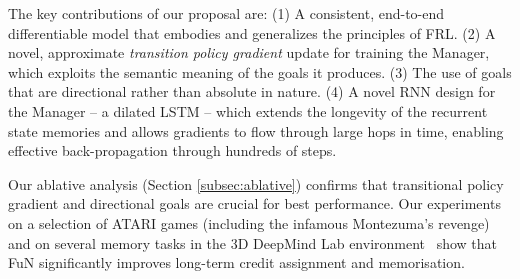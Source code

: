 %
The key contributions of our proposal are: (1) A consistent, end-to-end differentiable model that embodies and generalizes the principles of FRL. (2) A novel, approximate \textit{transition policy gradient} update for training the Manager, which exploits the semantic meaning of the goals it produces. (3) The use of goals that are directional rather than absolute in nature. (4) A novel RNN design for the Manager -- a dilated LSTM -- which extends the longevity of the recurrent state memories and allows gradients to flow through large hops in time, enabling effective back-propagation through hundreds of steps.
%

Our ablative analysis (Section \ref{subsec:ablative}) confirms that transitional policy gradient and directional goals are crucial for best performance. Our experiments on a selection of ATARI games (including the infamous Montezuma's revenge) and on several memory tasks in the 3D DeepMind Lab environment~\cite{beattie2016labyrinth} show that FuN significantly improves long-term credit assignment and memorisation. 

